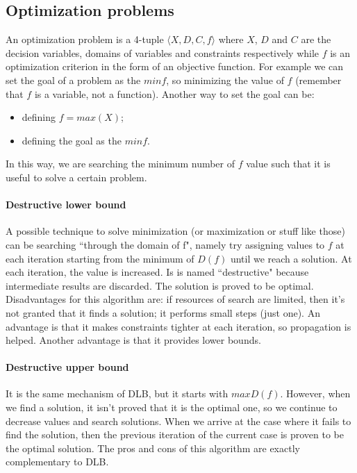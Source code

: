 \documentclass[10pt,a4paper]{article}
\begin{document}
\subsection{Optimization problems}
An optimization problem is a 4-tuple $\langle X, D, C, f \rangle$ where $X$,
$D$ and $C$ are the decision variables, domains of variables and constraints
respectively while $f$ is an optimization criterion in the form of an objective
function. For example we can set the goal of a problem as the $min f$, so
minimizing the value of $f$ (remember that $f$ is a variable, not a function).
Another way to set the goal can be:

\begin{itemize}
    \item defining $f = max(X)$;
    \item defining the goal as the $min f$.
\end{itemize}
In this way, we are searching the minimum number of $f$ value such that it is
useful to solve a certain problem.

\paragraph{Destructive lower bound}
A possible technique to solve minimization (or maximization or stuff like those)
can be searching ``through the domain of f", namely try assigning values to $f$
at each iteration starting from the minimum of $D(f)$ until we reach a solution.
At each iteration, the value is increased. Is is named ``destructive" because
intermediate results are discarded. The solution is proved to be optimal.
Disadvantages for this algorithm are: if resources of search are limited,
then it's not granted that it finds a solution; it performs small steps (just
one). An advantage is that it makes constraints tighter at each iteration, so
propagation is helped. Another advantage is that it provides lower bounds.

\paragraph{Destructive upper bound}
It is the same mechanism of DLB, but it starts with $max D(f)$. However, when we
find a solution, it isn't proved that it is the optimal one, so we continue to
decrease values and search solutions. When we arrive at the case where it fails
to find the solution, then the previous iteration of the current case is proven
to be the optimal solution. The pros and cons of this algorithm are exactly
complementary to DLB.
\end{document}
